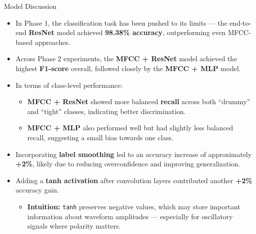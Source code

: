 \documentclass{beamer}
\begin{document}
\begin{frame}{Model Discussion}
  \scriptsize
\begin{itemize}
    \item In Phase 1, the classification task has been pushed to its limits — the end-to-end \textbf{ResNet} model achieved \textbf{98.38\% accuracy}, outperforming even MFCC-based approaches.
    \item Across Phase 2 experiments, the \textbf{MFCC + ResNet} model achieved the highest \textbf{F1-score} overall, followed closely by the \textbf{MFCC + MLP} model.
    \item In terms of class-level performance:
        \begin{itemize}
          \scriptsize
            \item \textbf{MFCC + ResNet} showed more balanced \textbf{recall} across both “drummy” and “tight” classes, indicating better discrimination.
            \item \textbf{MFCC + MLP} also performed well but had slightly less balanced recall, suggesting a small bias towards one class.
        \end{itemize}
    \item Incorporating \textbf{label smoothing} led to an accuracy increase of approximately \textbf{+2\%}, likely due to reducing overconfidence and improving generalization.
    \item Adding a \textbf{tanh activation} after convolution layers contributed another \textbf{+2\%} accuracy gain.
        \begin{itemize}
          \scriptsize
            \item \textbf{Intuition:} \texttt{tanh} preserves negative values, which may store important information about waveform amplitudes — especially for oscillatory signals where polarity matters.
        \end{itemize}
\end{itemize}
\end{frame}
\end{document}
